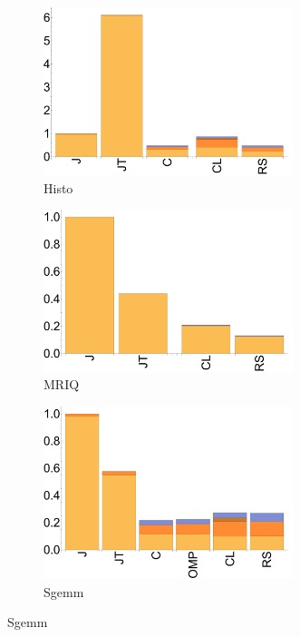 \begin{figure}[ht]
  \begin{subfigure}[b]{0.3\textwidth}
      \includegraphics[width=0.8\textwidth]{data/bbattery_histogram_nexus7.pdf}
      \caption{Histo}
  \end{subfigure}

  \begin{subfigure}[b]{0.3\textwidth}
      \includegraphics[width=0.8\textwidth]{data/bbattery_mriq_nexus7.pdf}
      \caption{MRIQ}
  \end{subfigure}

  \begin{subfigure}[b]{0.3\textwidth}
      \includegraphics[width=0.8\textwidth]{data/bbattery_sgemm_nexus7.pdf}
      \caption{Sgemm}
  \end{subfigure}


\end{figure}
